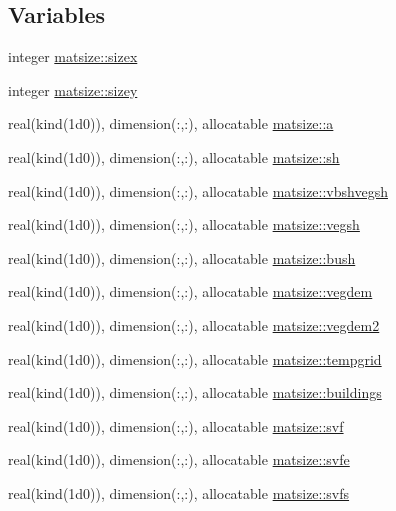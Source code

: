 \subsection*{Variables}
\begin{DoxyCompactItemize}
\item 
integer \hyperlink{namespacematsize_ab94e75e382a77f33021c061c1fd031ba}{matsize\+::sizex}
\item 
integer \hyperlink{namespacematsize_a2e4c4ca15fba50043654eaca59568a8f}{matsize\+::sizey}
\item 
real(kind(1d0)), dimension(\+:,\+:), allocatable \hyperlink{namespacematsize_ac6b0576a44123086ec1fcb4fd07ae0cf}{matsize\+::a}
\item 
real(kind(1d0)), dimension(\+:,\+:), allocatable \hyperlink{namespacematsize_a8646e77bed1b06a41e4d3d230df88854}{matsize\+::sh}
\item 
real(kind(1d0)), dimension(\+:,\+:), allocatable \hyperlink{namespacematsize_a9f51b3ddaf5ee62ef1f8ded44384e64a}{matsize\+::vbshvegsh}
\item 
real(kind(1d0)), dimension(\+:,\+:), allocatable \hyperlink{namespacematsize_ae17419ca9fd6657bfc2f993e9caa074e}{matsize\+::vegsh}
\item 
real(kind(1d0)), dimension(\+:,\+:), allocatable \hyperlink{namespacematsize_a3891f5a70b2d3e3f1ce049f9ab702e87}{matsize\+::bush}
\item 
real(kind(1d0)), dimension(\+:,\+:), allocatable \hyperlink{namespacematsize_a0be49d58735406c79599404544199438}{matsize\+::vegdem}
\item 
real(kind(1d0)), dimension(\+:,\+:), allocatable \hyperlink{namespacematsize_a2265584cbc20b4787247165648ac5fdc}{matsize\+::vegdem2}
\item 
real(kind(1d0)), dimension(\+:,\+:), allocatable \hyperlink{namespacematsize_aabcb952c227c31fd4f5f61afd2fd52cd}{matsize\+::tempgrid}
\item 
real(kind(1d0)), dimension(\+:,\+:), allocatable \hyperlink{namespacematsize_a2787e88d9e90f148065c39be4439c550}{matsize\+::buildings}
\item 
real(kind(1d0)), dimension(\+:,\+:), allocatable \hyperlink{namespacematsize_a94334e57071e6a8dc83f66b04f8ea8fe}{matsize\+::svf}
\item 
real(kind(1d0)), dimension(\+:,\+:), allocatable \hyperlink{namespacematsize_a890ca1fcc0cc7dce50caad1a19886268}{matsize\+::svfe}
\item 
real(kind(1d0)), dimension(\+:,\+:), allocatable \hyperlink{namespacematsize_a13810d151375d64bd53a45cd89fad066}{matsize\+::svfs}

\end{DoxyCompactItemize}
